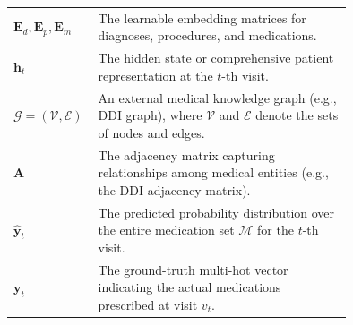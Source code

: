 \documentclass[manuscript,review]{acmart}
\begin{document}
\begin{table}[h]
\begin{tabular}{lp{0.75\linewidth}}
\midrule
$\mathbf{E}_d, \mathbf{E}_p, \mathbf{E}_m$ & The learnable embedding matrices for diagnoses, procedures, and medications. \\
$\mathbf{h}_t$ & The hidden state or comprehensive patient representation at the $t$-th visit. \\
$\mathcal{G} = (\mathcal{V}, \mathcal{E})$ & An external medical knowledge graph (e.g., DDI graph), where $\mathcal{V}$ and $\mathcal{E}$ denote the sets of nodes and edges. \\
$\mathbf{A}$ & The adjacency matrix capturing relationships among medical entities (e.g., the DDI adjacency matrix). \\
$\hat{\mathbf{y}}_t$ & The predicted probability distribution over the entire medication set $\mathcal{M}$ for the $t$-th visit. \\
$\mathbf{y}_t$ & The ground-truth multi-hot vector indicating the actual medications prescribed at visit $v_t$. \\
\bottomrule
\end{tabular}
\end{table}




\end{document}
